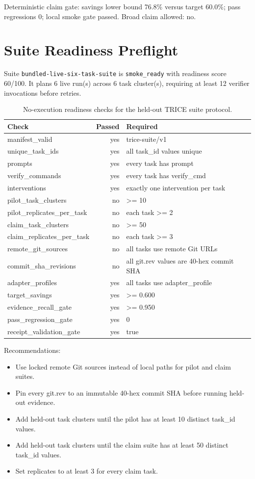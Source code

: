 \documentclass[10pt]{article}
\begin{document}
        Deterministic claim gate: savings lower bound
        76.8\% versus target 60.0\%;
        pass regressions 0; local smoke gate
        passed. Broad claim
        allowed: no.

        \section{Suite Readiness Preflight}
Suite \texttt{bundled-live-six-task-suite} is \texttt{smoke\_ready} with readiness score 60/100. It plans 6 live run(s) across 6 task cluster(s), requiring at least 12 verifier invocations before retries.

\begin{table}[h]
\centering
\begin{tabular}{lrl}
\toprule
Check & Passed & Required \\
\midrule
manifest\_valid & yes & trice-suite/v1 \\
unique\_task\_ids & yes & all task\_id values unique \\
prompts & yes & every task has prompt \\
verify\_commands & yes & every task has verify\_cmd \\
interventions & yes & exactly one intervention per task \\
pilot\_task\_clusters & no & >= 10 \\
pilot\_replicates\_per\_task & no & each task >= 2 \\
claim\_task\_clusters & no & >= 50 \\
claim\_replicates\_per\_task & no & each task >= 3 \\
remote\_git\_sources & no & all tasks use remote Git URLs \\
commit\_sha\_revisions & no & all git.rev values are 40-hex commit SHA \\
adapter\_profiles & yes & all tasks use adapter\_profile \\
target\_savings & yes & >= 0.600 \\
evidence\_recall\_gate & yes & >= 0.950 \\
pass\_regression\_gate & yes & 0 \\
receipt\_validation\_gate & yes & true \\
\bottomrule
\end{tabular}
\caption{No-execution readiness checks for the held-out TRICE suite protocol.}
\end{table}

\noindent Recommendations:
\begin{itemize}
\item Use locked remote Git sources instead of local paths for pilot and claim suites.
\item Pin every git.rev to an immutable 40-hex commit SHA before running held-out evidence.
\item Add held-out task clusters until the pilot has at least 10 distinct task\_id values.
\item Add held-out task clusters until the claim suite has at least 50 distinct task\_id values.
\item Set replicates to at least 3 for every claim task.
\end{itemize}
\end{document}
